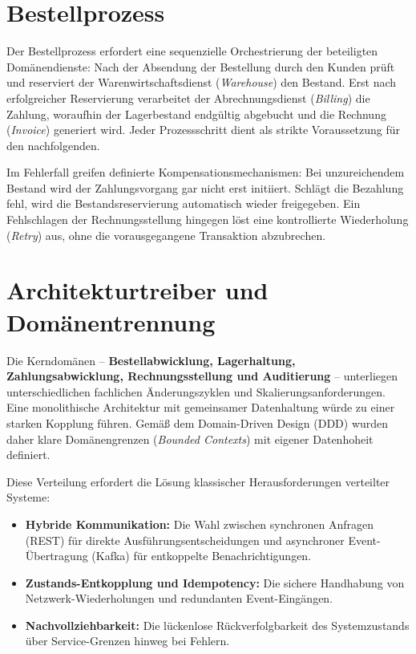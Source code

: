 \documentclass[
  11pt,
  a4paper,
  oneside,
  headings=normal,
  parskip=half,
  DIV=12
]{scrreprt}
\begin{document}
\section{Bestellprozess}

Der Bestellprozess erfordert eine sequenzielle Orchestrierung der beteiligten Domänendienste: Nach der Absendung der Bestellung durch den Kunden prüft und reserviert der Warenwirtschaftsdienst (\textit{Warehouse}) den Bestand. Erst nach erfolgreicher Reservierung verarbeitet der Abrechnungsdienst (\textit{Billing}) die Zahlung, woraufhin der Lagerbestand endgültig abgebucht und die Rechnung (\textit{Invoice}) generiert wird. Jeder Prozessschritt dient als strikte Voraussetzung für den nachfolgenden.

Im Fehlerfall greifen definierte Kompensationsmechanismen: Bei unzureichendem Bestand wird der Zahlungsvorgang gar nicht erst initiiert. Schlägt die Bezahlung fehl, wird die Bestandsreservierung automatisch wieder freigegeben. Ein Fehlschlagen der Rechnungsstellung hingegen löst eine kontrollierte Wiederholung (\textit{Retry}) aus, ohne die vorausgegangene Transaktion abzubrechen.


\section{Architekturtreiber und Domänentrennung}

Die Kerndomänen – \textbf{Bestellabwicklung, Lagerhaltung, Zahlungsabwicklung, Rechnungsstellung und Auditierung} – unterliegen unterschiedlichen fachlichen Änderungszyklen und Skalierungsanforderungen. Eine monolithische Architektur mit gemeinsamer Datenhaltung würde zu einer starken Kopplung führen. Gemäß dem Domain-Driven Design (DDD) wurden daher klare Domänengrenzen (\textit{Bounded Contexts}) mit eigener Datenhoheit definiert.

Diese Verteilung erfordert die Lösung klassischer Herausforderungen verteilter Systeme:
\begin{itemize}
    \item \textbf{Hybride Kommunikation:} Die Wahl zwischen synchronen Anfragen (REST) für direkte Ausführungsentscheidungen und asynchroner Event-Übertragung (Kafka) für entkoppelte Benachrichtigungen.
    \item \textbf{Zustands-Entkopplung und Idempotency:} Die sichere Handhabung von Netzwerk-Wiederholungen und redundanten Event-Eingängen.
    \item \textbf{Nachvollziehbarkeit:} Die lückenlose Rückverfolgbarkeit des Systemzustands über Service-Grenzen hinweg bei Fehlern.
\end{itemize}
\end{document}
